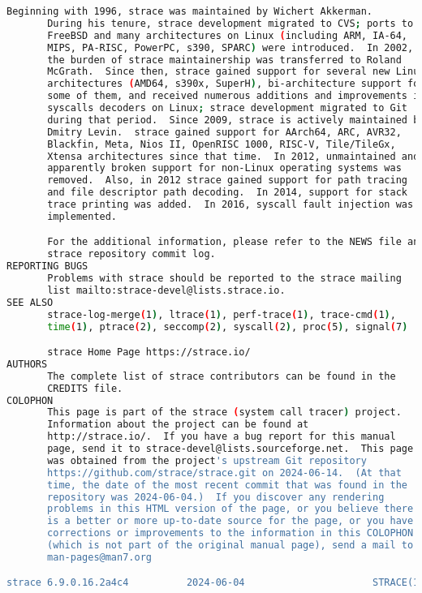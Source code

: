 {{\begin{lstlisting}[language=bash]
       Beginning with 1996, strace was maintained by Wichert Akkerman.
       During his tenure, strace development migrated to CVS; ports to
       FreeBSD and many architectures on Linux (including ARM, IA-64,
       MIPS, PA-RISC, PowerPC, s390, SPARC) were introduced.  In 2002,
       the burden of strace maintainership was transferred to Roland
       McGrath.  Since then, strace gained support for several new Linux
       architectures (AMD64, s390x, SuperH), bi-architecture support for
       some of them, and received numerous additions and improvements in
       syscalls decoders on Linux; strace development migrated to Git
       during that period.  Since 2009, strace is actively maintained by
       Dmitry Levin.  strace gained support for AArch64, ARC, AVR32,
       Blackfin, Meta, Nios II, OpenRISC 1000, RISC-V, Tile/TileGx,
       Xtensa architectures since that time.  In 2012, unmaintained and
       apparently broken support for non-Linux operating systems was
       removed.  Also, in 2012 strace gained support for path tracing
       and file descriptor path decoding.  In 2014, support for stack
       trace printing was added.  In 2016, syscall fault injection was
       implemented.

       For the additional information, please refer to the NEWS file and
       strace repository commit log.
REPORTING BUGS
       Problems with strace should be reported to the strace mailing
       list mailto:strace-devel@lists.strace.io.
SEE ALSO
       strace-log-merge(1), ltrace(1), perf-trace(1), trace-cmd(1),
       time(1), ptrace(2), seccomp(2), syscall(2), proc(5), signal(7)

       strace Home Page https://strace.io/
AUTHORS
       The complete list of strace contributors can be found in the
       CREDITS file.
COLOPHON
       This page is part of the strace (system call tracer) project.
       Information about the project can be found at 
       http://strace.io/.  If you have a bug report for this manual
       page, send it to strace-devel@lists.sourceforge.net.  This page
       was obtained from the project's upstream Git repository
       https://github.com/strace/strace.git on 2024-06-14.  (At that
       time, the date of the most recent commit that was found in the
       repository was 2024-06-04.)  If you discover any rendering
       problems in this HTML version of the page, or you believe there
       is a better or more up-to-date source for the page, or you have
       corrections or improvements to the information in this COLOPHON
       (which is not part of the original manual page), send a mail to
       man-pages@man7.org

strace 6.9.0.16.2a4c4          2024-06-04                      STRACE(1)
\end{lstlisting}
}}

\endinput  %